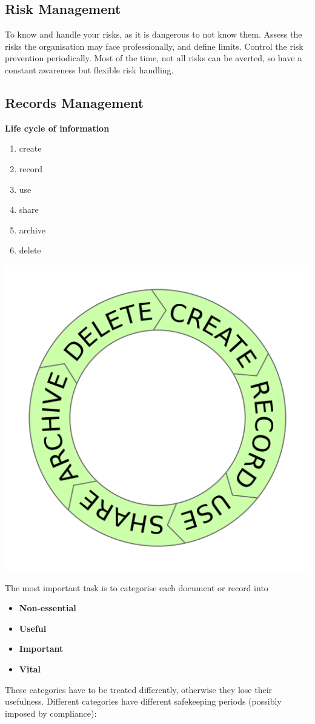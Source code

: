 \documentclass[11pt]{article}
\theoremstyle{definition}
\begin{document}
\subsection{Risk Management}
To know and handle your risks, as it is dangerous to not know them. Assess the risks the organisation may face professionally, and define limits. Control the risk prevention periodically. Most of the time, not all risks can be averted, so have a constant awareness but flexible risk handling.

\subsection{Records Management}
\begin{minipage}{0.6\linewidth}
	\textbf{Life cycle of information}
	\begin{enumerate}
		\item create
		\item record
		\item use
		\item share
		\item archive
		\item delete
	\end{enumerate}
\end{minipage}
\begin{minipage}{0.4\linewidth}
	\centering
	\includegraphics[width=0.8\linewidth]{img/information_life_cycle.png}
\end{minipage}

\vspace{1em}
\noindent
The most important task is to categorise each document or record into
\begin{itemize}
	\item \textbf{Non-essential}
	\item \textbf{Useful}
	\item \textbf{Important}
	\item \textbf{Vital}
\end{itemize}
These categories have to be treated differently, otherwise they lose their usefulness. Different categories have different safekeeping periods (possibly imposed by compliance):
\end{document}
